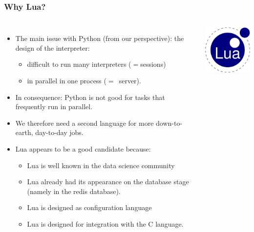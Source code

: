 \documentclass{beamer}
\begin{document}
\begin{frame}[shrink]
\frametitle{Why Lua?}
\begin{columns}[T]
\begin{itemize}
\item The main issue with Python (from our perspective):
      the design of the interpreter:
      \begin{itemize}
      \item difficult to run many interpreters ($=$sessions)
      \item in parallel in one process ($=$\nowdb\ server).
      \end{itemize}
\item In consequence:
      Python is not good for tasks that frequently run
      in parallel.
\item We therefore need a second language for more
      down-to-earth, day-to-day  jobs.
\item Lua appears to be a good candidate because:
\begin{itemize}
\item Lua is well known in the data science community
\item Lua already had its appearance on the database stage\\
      (namely in the redis  database).
\item Lua is designed as configuration language
\item Lua is designed for integration with the C language.
\end{itemize}
\end{itemize}
\vskip5cm
\linewidth
\includegraphics[width=0.8\linewidth]{lualogo.png}
\end{columns}
\end{frame}
\end{document}
